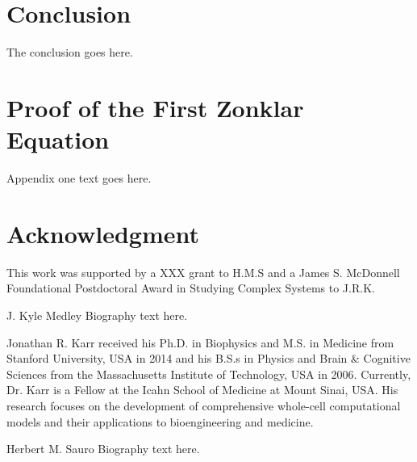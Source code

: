 \documentclass[journal,transmag]{IEEEtran}
\begin{document}




\section{Conclusion}
The conclusion goes here.


\appendices
\section{Proof of the First Zonklar Equation}
Appendix one text goes here.

\section*{Acknowledgment}
This work was supported by a XXX grant to H.M.S and a James S. McDonnell Foundational Postdoctoral Award in Studying Complex Systems to J.R.K.

\ifCLASSOPTIONcaptionsoff
  \newpage
\fi




\begin{IEEEbiography}{J. Kyle Medley}
Biography text here.
\end{IEEEbiography}

\begin{IEEEbiography}{Jonathan R. Karr}
received his Ph.D. in Biophysics and M.S. in Medicine from Stanford University, USA in 2014 and his B.S.s in Physics and Brain \& Cognitive Sciences from the Massachusetts Institute of Technology, USA in 2006. Currently, Dr. Karr is a Fellow at the Icahn School of Medicine at Mount Sinai, USA. His research focuses on the development of comprehensive whole-cell computational models and their applications to bioengineering and medicine.
\end{IEEEbiography}

\begin{IEEEbiography}{Herbert M. Sauro}
Biography text here.
\end{IEEEbiography}
\end{document}
